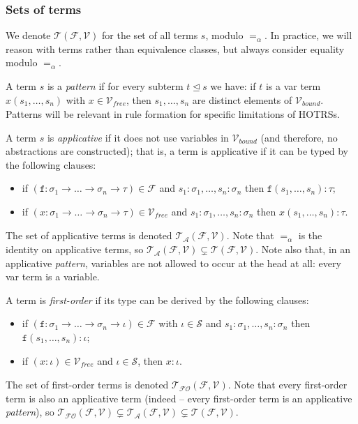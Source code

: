 \documentclass{lmcs}
\theoremstyle{theorem}\newtheorem{theorem}[dummy]{Theorem}
\theoremstyle{theorem}\newtheorem{lemma}[dummy]{Lemma}
\theoremstyle{theorem}\newtheorem{corollary}[dummy]{Corollary}
\theoremstyle{definition}\newtheorem{definition}[dummy]{Definition}
\theoremstyle{definition}\newtheorem{example}[dummy]{Example}
\newcommand{\F}{\mathcal{F}}
\newcommand{\V}{\mathcal{V}}
\newcommand{\Vfree}{\mathcal{V}_{\mathit{free}}}
\newcommand{\Vbound}{\mathcal{V}_{\mathit{bound}}}
\newcommand{\Sorts}{\mathcal{S}}
\newcommand{\Terms}{\mathcal{T}}
\newcommand{\ATerms}{\mathcal{T}_{\mathcal{A}}}
\newcommand{\FOTerms}{\mathcal{T}_{\mathcal{FO}}}
\newcommand{\asort}{\iota}
\newcommand{\atype}{\sigma}
\newcommand{\btype}{\tau}
\newcommand{\identifier}[1]{\mathtt{#1}}
\newcommand{\afun}{\identifier{f}}
\newcommand{\avar}{x}
\newcommand{\abs}[2]{\lambda #1.#2}
\newcommand{\arrtype}{\rightarrow}
\newcommand{\subtermeq}{\unlhd}
\newcommand{\mysubsection}[1]{\vspace{-12pt}\subsubsection{#1}}
\begin{document}
%

\mysubsection{Sets of terms}

We denote $\Terms(\F,\V)$ for the set of all terms $s$, modulo $=_\alpha$.  In practice, we will
reason with terms rather than equivalence classes, but always consider equality modulo $=_\alpha$.

A term $s$ is a \emph{pattern} if for every subterm $t \subtermeq s$ we have: if $t$ is a var term
$x(s_1,\dots,s_n)$ with $x \in \Vfree$, then $s_1,\dots,s_n$ are distinct elements of $\Vbound$.
Patterns will be relevant in rule formation for specific limitations of HOTRSs.

A term $s$ is \emph{applicative} if it does not use variables in $\Vbound$ (and therefore, no
abstractions are constructed); that is, a term is applicative if it can be typed by the
following clauses:
\begin{itemize}
\item if $(\afun : \atype_1 \arrtype \dots \arrtype \atype_n \arrtype \btype) \in \F$ and
  $s_1 : \atype_1,\dots,s_n : \atype_n$ then $\afun(s_1,\dots,s_n) : \btype$;
\item if $(\avar : \atype_1 \arrtype \dots \arrtype \atype_n \arrtype \btype) \in \Vfree$ and
  $s_1 : \atype_1,\dots,s_n : \atype_n$ then $\avar(s_1,\dots,s_n) : \btype$.
\end{itemize}
The set of applicative terms is denoted $\ATerms(\F,\V)$.  Note that $=_\alpha$ is the
identity on applicative terms, so $\ATerms(\F,\V) \subsetneq \Terms(\F,\V)$.
Note also that, in an applicative \emph{pattern}, variables are not allowed to occur at the head
at all: every var term is a variable.

A term is \emph{first-order} if its type can be derived by the following clauses:
\begin{itemize}
\item if $(\afun : \atype_1 \arrtype \dots \arrtype \atype_n \arrtype \asort) \in \F$ with $\asort
  \in \Sorts$ and
  $s_1 : \atype_1,\dots,s_n : \atype_n$ then $\afun(s_1,\dots,s_n) : \asort$;
\item if $(\avar : \asort) \in \Vfree$ and $\asort \in \Sorts$, then $\avar : \asort$.
\end{itemize}
The set of first-order terms is denoted $\FOTerms(\F,\V)$.  Note that every first-order term is
also an applicative term (indeed -- every first-order term is an applicative \emph{pattern}),
so $\FOTerms(\F,\V) \subsetneq \ATerms(\F,\V) \subsetneq \Terms(\F,\V)$.
\end{document}
